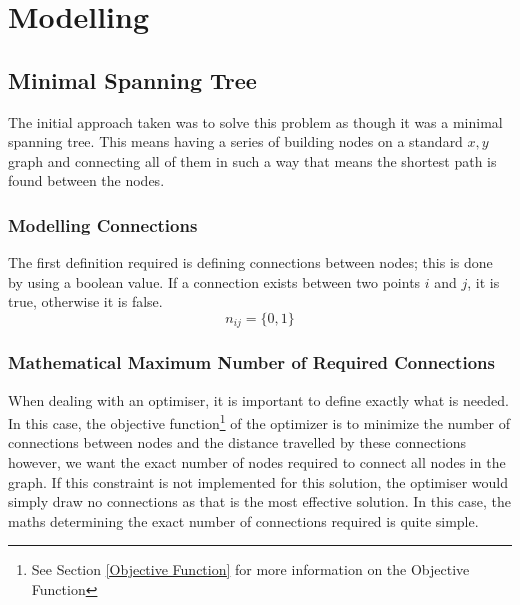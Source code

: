 
\chapter{Modelling}\label{Modelling}

\ifpdf
    \graphicspath{{Chapter3/Figs/Raster/}{Chapter3/Figs/PDF/}{Chapter3/Figs/}}
\else
    \graphicspath{{Chapter3/Figs/Vector/}{Chapter3/Figs/}}
\fi


\section{Minimal Spanning Tree}\label{Minimal Spanning Tree}
The initial approach taken was to solve this problem as though it was a minimal spanning tree. This means having a series of building nodes on a standard $x,y$ graph and connecting all of them in such a way that means the shortest path is found between the nodes.

\subsection{Modelling Connections}\label{Modelling Connnections}
The first definition required is defining connections between nodes; this is done by using a boolean value. If a connection exists between two points $i$ and $j$, it is true, otherwise it is false.
\[
n_{ij} = \{0,1\}
\]
\subsection{Mathematical Maximum Number of Required Connections}\label{Mathematical Maximum Number of Required Connections}
When dealing with an optimiser, it is important to define exactly what is needed. In this case, the objective function\footnote{See Section \ref{Objective Function} for more information on the Objective Function} of the optimizer is to minimize the number of connections between nodes and the distance travelled by these connections however, we want the exact number of nodes required to connect all nodes in the graph. If this constraint is not implemented for this solution, the optimiser would simply draw no connections as that is the most effective solution.
In this case, the maths determining the exact number of connections required is quite simple.

